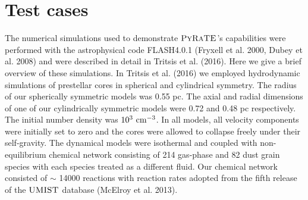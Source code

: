 \documentclass{mn2e}
\begin{document}
\section{Test cases}\label{tests}

The numerical simulations used to demonstrate $\textsc{PyRaTE}$'s capabilities were performed with the astrophysical code FLASH4.0.1 (Fryxell et al. 2000, Dubey et al. 2008) and were described in detail in Tritsis et al. (2016). Here we give a brief overview of these simulations. In Tritsis et al. (2016) we employed hydrodynamic simulations of prestellar cores in spherical and cylindrical symmetry. The radius of our spherically symmetric models was 0.55 pc. The axial and radial dimensions of one of our cylindrically symmetric models were 0.72 and 0.48 pc respectively. The initial number density was $\rm{10^3~cm^{-3}}$. In all models, all velocity components were initially set to zero and the cores were allowed to collapse freely under their self-gravity. The dynamical models were isothermal and coupled with non-equilibrium chemical network consisting of 214 gas-phase and 82 dust grain species with each species treated as a different fluid. Our chemical network consisted of $\sim$ 14000 reactions with reaction rates adopted from the fifth release of the $\textsc{UMIST}$ database (McElroy et al. 2013).
\end{document}
